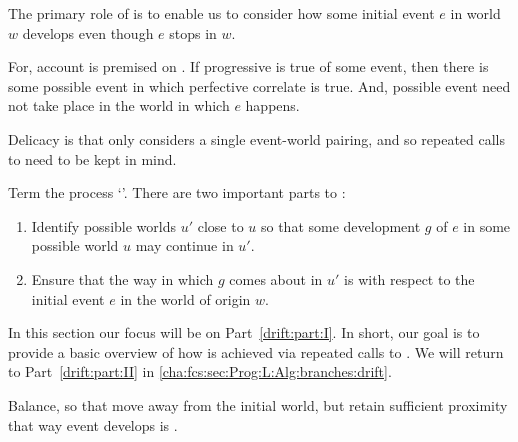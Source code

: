 \begin{note}
  The primary role of \AlgFindBranches{} is to enable us to consider how some initial event \(e\) in world \(w\) develops even though \(e\) stops in \(w\).

  For, account is premised on \assuPP{}.
  If progressive is true of some event, then there is some possible event in which perfective correlate is true.
  And, possible event need not take place in the world in which \(e\) happens.

  Delicacy is that \AlgFindBranches{} only considers a single event-world pairing, and so repeated calls to \AlgFindBranches{} need to be kept in mind.

  Term the process `\emph{}'.
  There are two important parts to :
   \begin{enumerate}[label=\Roman*., ref=(\Roman*), noitemsep]
  \item
    \label{drift:part:I}
    Identify possible worlds \(u'\) close to \(u\) so that some development \(g\) of \(e\) in some possible world \(u\) may continue in \(u'\).
  \item
    \label{drift:part:II}
    Ensure that the way in which \(g\) comes about in \(u'\) is \drAdj{} with respect to the initial event \(e\) in the world of origin \(w\).
  \end{enumerate}

  In this section our focus will be on Part~\ref{drift:part:I}.
  In short, our goal is to provide a basic overview of how  is achieved via repeated calls to \AlgFindBranches{}.
  We will return to Part~\ref{drift:part:II} in \autoref{cha:fcs:sec:Prog:L:Alg:branches:drift}.
\end{note}

\begin{note}
  Balance, \drift{} so that move away from the initial world, but retain sufficient proximity that way event develops is \drAdj{}.
\end{note}

